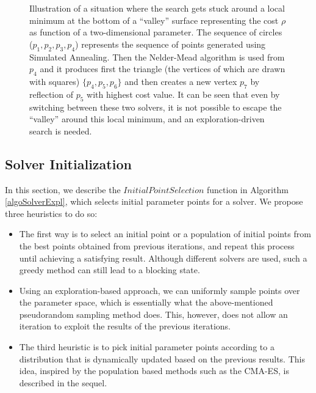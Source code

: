 \begin{figure}

\caption{Illustration of a situation where the search gets stuck around a local minimum at the bottom of a ``valley'' surface representing the cost $\rho$ as function of a two-dimensional parameter. The sequence of circles ($p_1, p_2, p_3, p_4$) represents the sequence of points generated using Simulated Annealing. Then the Nelder-Mead algorithm is used from $p_4$ and it produces first the triangle (the vertices of which are drawn with squares)  $\{p_4, p_5, p_6 \}$ and then creates a new vertex $p_7$ by reflection of $p_5$ with highest cost value. It can be seen that even by switching between these two solvers, it is not possible to escape the ``valley'' around this local minimum, and an exploration-driven search is needed.} 
\end{figure}

\subsection{Solver Initialization}\label{sec:init}

In this section, we describe the $InitialPointSelection$ function in Algorithm \ref{algoSolverExpl}, which selects initial parameter points for a solver. We propose three heuristics to do so:
\begin{itemize}
\item The first way is to select an initial point or a population of initial points from the best points obtained from previous iterations, and repeat this process until achieving a satisfying result. Although different solvers are used, such a greedy method can still lead to a blocking state. 
\item Using an exploration-based approach, we can uniformly sample points over the parameter space, which is essentially what the above-mentioned pseudorandom sampling method does. This, however, does not allow an iteration to exploit the results of the previous iterations. 
\item The third heuristic is to pick initial parameter points according to a distribution that is dynamically updated based on the previous results. This idea, inspired by the population based methods such as the CMA-ES, is described in the sequel. 
\end{itemize}
